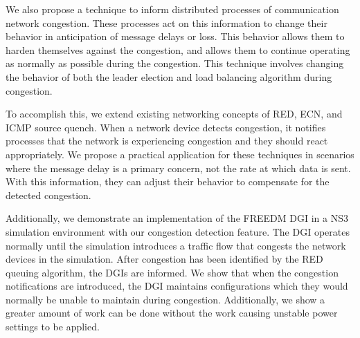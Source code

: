 We also propose a technique to inform distributed processes of communication network congestion.
These processes act on this information to change their behavior in anticipation of message delays or loss.
This behavior allows them to harden themselves against the congestion, and allows them to continue operating as normally as possible during the congestion.
This technique involves changing the behavior of both the leader election\cite{INVITATIONELECTION} and load balancing algorithm during congestion.

To accomplish this, we extend existing networking concepts of \ac{RED}, \ac{ECN}\cite{RFCECN}, and ICMP source quench\cite{RFCSOURCEQUENCH}.
When a network device detects congestion, it notifies processes that the network is experiencing congestion and they should react appropriately.
We propose a practical application for these techniques in scenarios where the message delay is a primary concern, not the rate at which data is sent.
With this information, they can adjust their behavior to compensate for the detected congestion.

Additionally, we demonstrate an implementation of the \ac{FREEDM} \ac{DGI} in a \ac{NS3} simulation environment\cite{NS3} with our congestion detection feature.
The \ac{DGI} operates normally until the simulation introduces a traffic flow that congests the network devices in the simulation.
After congestion has been identified by the \ac{RED} queuing algorithm, the \ac{DGI}s are informed. %
We show that when the congestion notifications are introduced, the \ac{DGI} maintains configurations which they would normally be unable to maintain during congestion.
Additionally, we show a greater amount of work can be done without the work causing unstable power settings to be applied.

